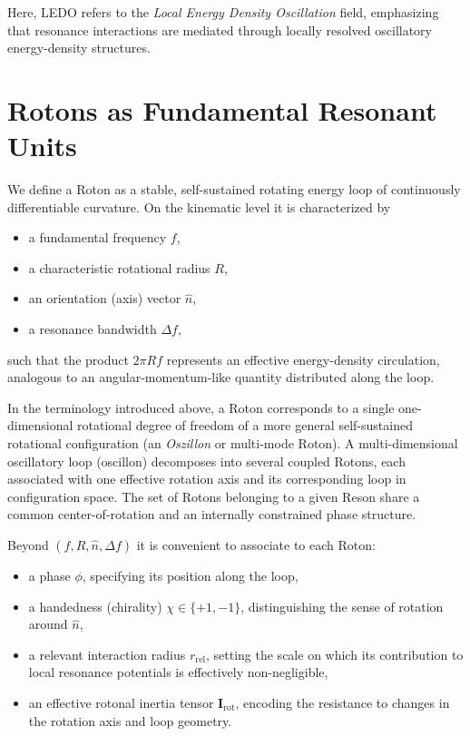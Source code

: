 \documentclass[11pt,a4paper]{article}
\begin{document}
Here, LEDO refers to the \emph{Local Energy Density Oscillation} field, emphasizing that resonance interactions are mediated through locally resolved oscillatory energy-density structures.


\section{Rotons as Fundamental Resonant Units}
We define a Roton as a stable, self-sustained rotating energy loop of continuously differentiable curvature. On the kinematic level it is characterized by
\begin{itemize}
    \item a fundamental frequency $f$,
    \item a characteristic rotational radius $R$,
    \item an orientation (axis) vector $\hat{n}$,
    \item a resonance bandwidth $\Delta f$,
\end{itemize}
such that the product $2\pi R f$ represents an effective energy-density circulation, analogous to an angular-momentum-like quantity distributed along the loop.

In the terminology introduced above, a Roton corresponds to a single one-dimensional rotational degree of freedom of a more general self-sustained rotational configuration (an \emph{Oszillon} or multi-mode Roton). A multi-dimensional oscillatory loop (oscillon) decomposes into several coupled Rotons, each associated with one effective rotation axis and its corresponding loop in configuration space. The set of Rotons belonging to a given Reson share a common center-of-rotation and an internally constrained phase structure.

Beyond $(f, R, \hat{n}, \Delta f)$ it is convenient to associate to each Roton:
\begin{itemize}
    \item a phase $\phi$, specifying its position along the loop,
    \item a handedness (chirality) $\chi \in \{+1,-1\}$, distinguishing the sense of rotation around $\hat{n}$,
    \item a relevant interaction radius $r_{\mathrm{rel}}$, setting the scale on which its contribution to local resonance potentials is effectively non-negligible,
    \item an effective rotonal inertia tensor $\mathbf{I}_\mathrm{rot}$, encoding the resistance to changes in the rotation axis and loop geometry.
\end{itemize}
\end{document}
